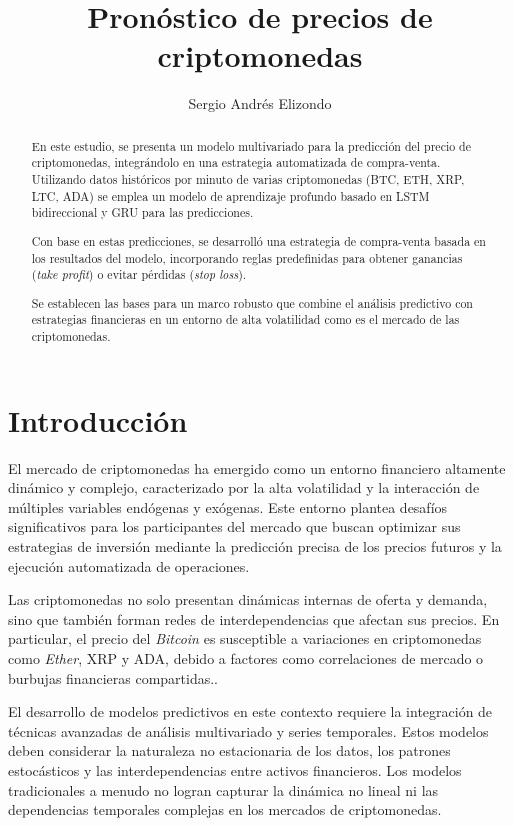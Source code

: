\documentclass[]{article}
\title{Pronóstico de precios de criptomonedas}
\author{Sergio Andrés Elizondo}
\begin{document}
\maketitle

\begin{abstract}

En este estudio, se presenta un modelo multivariado para la predicción del precio de criptomonedas, integrándolo en una estrategia automatizada de compra-venta. Utilizando datos históricos por minuto de varias criptomonedas (BTC, ETH, XRP, LTC, ADA) se emplea un modelo de aprendizaje profundo basado en LSTM bidireccional y GRU para las predicciones.

Con base en estas predicciones, se desarrolló una estrategia de compra-venta basada en los resultados del modelo, incorporando reglas predefinidas para obtener ganancias (\textit{take profit}) o evitar pérdidas (\textit{stop loss}).

Se establecen las bases para un marco robusto que combine el análisis predictivo con estrategias financieras en un entorno de alta volatilidad como es el mercado de las criptomonedas. 

\end{abstract}

\section{Introducción}

El mercado de criptomonedas ha emergido como un entorno financiero altamente dinámico y complejo, caracterizado por la alta volatilidad y la interacción de múltiples variables endógenas y exógenas. Este entorno plantea desafíos significativos para los participantes del mercado que buscan optimizar sus estrategias de inversión mediante la predicción precisa de los precios futuros y la ejecución automatizada de operaciones.

Las criptomonedas no solo presentan dinámicas internas de oferta y demanda, sino que también forman redes de interdependencias que afectan sus precios. En particular, el precio del \textit{Bitcoin} es susceptible a variaciones en criptomonedas como \textit{Ether}, XRP y ADA, debido a factores como correlaciones de mercado o burbujas financieras compartidas.\cite{haykir}.

El desarrollo de modelos predictivos en este contexto requiere la integración de técnicas avanzadas de análisis multivariado y series temporales. Estos modelos deben considerar la naturaleza no estacionaria de los datos, los patrones estocásticos y las interdependencias entre activos financieros. Los modelos tradicionales a menudo no logran capturar la dinámica no lineal ni las dependencias temporales complejas en los mercados de criptomonedas.
\end{document}
